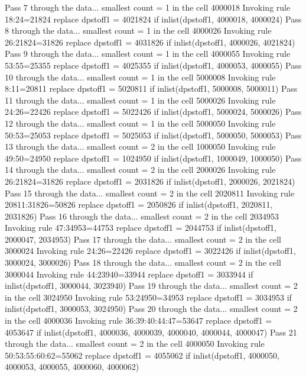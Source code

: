 Pass 7 through the data...
  smallest count = 1 in the cell      4000018
  Invoking rule 18:24=21824
  replace dpstoff1 = 4021824 if inlist(dpstoff1, 4000018, 4000024)
Pass 8 through the data...
  smallest count = 1 in the cell      4000026
  Invoking rule 26:21824=31826
  replace dpstoff1 = 4031826 if inlist(dpstoff1, 4000026, 4021824)
Pass 9 through the data...
  smallest count = 1 in the cell      4000055
  Invoking rule 53:55=25355
  replace dpstoff1 = 4025355 if inlist(dpstoff1, 4000053, 4000055)
Pass 10 through the data...
  smallest count = 1 in the cell      5000008
  Invoking rule 8:11=20811
  replace dpstoff1 = 5020811 if inlist(dpstoff1, 5000008, 5000011)
Pass 11 through the data...
  smallest count = 1 in the cell      5000026
  Invoking rule 24:26=22426
  replace dpstoff1 = 5022426 if inlist(dpstoff1, 5000024, 5000026)
Pass 12 through the data...
  smallest count = 1 in the cell      5000050
  Invoking rule 50:53=25053
  replace dpstoff1 = 5025053 if inlist(dpstoff1, 5000050, 5000053)
Pass 13 through the data...
  smallest count = 2 in the cell      1000050
  Invoking rule 49:50=24950
  replace dpstoff1 = 1024950 if inlist(dpstoff1, 1000049, 1000050)
Pass 14 through the data...
  smallest count = 2 in the cell      2000026
  Invoking rule 26:21824=31826
  replace dpstoff1 = 2031826 if inlist(dpstoff1, 2000026, 2021824)
Pass 15 through the data...
  smallest count = 2 in the cell      2020811
  Invoking rule 20811:31826=50826
  replace dpstoff1 = 2050826 if inlist(dpstoff1, 2020811, 2031826)
Pass 16 through the data...
  smallest count = 2 in the cell      2034953
  Invoking rule 47:34953=44753
  replace dpstoff1 = 2044753 if inlist(dpstoff1, 2000047, 2034953)
Pass 17 through the data...
  smallest count = 2 in the cell      3000024
  Invoking rule 24:26=22426
  replace dpstoff1 = 3022426 if inlist(dpstoff1, 3000024, 3000026)
Pass 18 through the data...
  smallest count = 2 in the cell      3000044
  Invoking rule 44:23940=33944
  replace dpstoff1 = 3033944 if inlist(dpstoff1, 3000044, 3023940)
Pass 19 through the data...
  smallest count = 2 in the cell      3024950
  Invoking rule 53:24950=34953
  replace dpstoff1 = 3034953 if inlist(dpstoff1, 3000053, 3024950)
Pass 20 through the data...
  smallest count = 2 in the cell      4000036
  Invoking rule 36:39:40:44:47=53647
  replace dpstoff1 = 4053647 if inlist(dpstoff1, 4000036, 4000039, 4000040, 4000044, 4000047)
Pass 21 through the data...
  smallest count = 2 in the cell      4000050
  Invoking rule 50:53:55:60:62=55062
  replace dpstoff1 = 4055062 if inlist(dpstoff1, 4000050, 4000053, 4000055, 4000060, 4000062)
